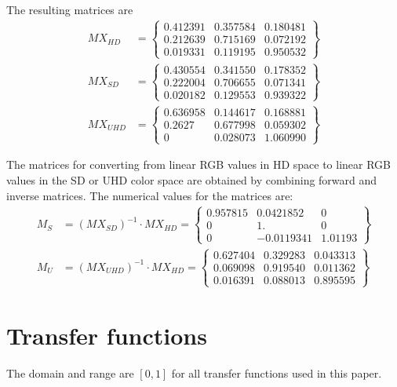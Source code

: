 \documentclass{article}
\begin{document}
The resulting matrices are
\begin{align*}
  MX_{HD} &=
  \begin{Bmatrix}
    0.412391 & 0.357584 & 0.180481 \\
    0.212639 & 0.715169 & 0.072192 \\
    0.019331 & 0.119195 & 0.950532 
  \end{Bmatrix}
\\
  MX_{SD} &=
  \begin{Bmatrix}
    0.430554 & 0.341550 & 0.178352 \\
    0.222004 & 0.706655 & 0.071341 \\
    0.020182 & 0.129553 & 0.939322 
  \end{Bmatrix}
\\
  MX_{UHD} &=
  \begin{Bmatrix}
    0.636958 & 0.144617 & 0.168881 \\
    0.2627 & 0.677998   & 0.059302 \\
    0      & 0.028073   & 1.060990    
  \end{Bmatrix}
\end{align*}

The matrices for converting from linear RGB values in HD space to linear RGB values in the SD or
UHD color space are obtained by combining forward and inverse matrices. The numerical values for
the matrices are:
\begin{align*}
  M_S &= (MX_{SD})^{-1} \cdot MX_{HD} =
  \begin{Bmatrix}
     0.957815 & 0.0421852 & 0 \\
     0 & 1. & 0 \\
     0 & -0.0119341 & 1.01193
  \end{Bmatrix}
\\
  M_U &= (MX_{UHD})^{-1} \cdot MX_{HD} =
  \begin{Bmatrix}
    0.627404 & 0.329283 & 0.043313 \\
    0.069098 & 0.919540 & 0.011362 \\
    0.016391 & 0.088013 & 0.895595
  \end{Bmatrix}
\end{align*}

\section{Transfer functions}

The domain and range are $[0,1]$ for all transfer functions used in this paper.
\end{document}
